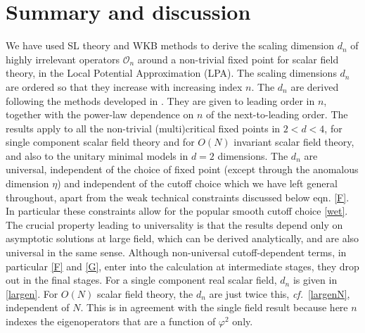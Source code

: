 \documentclass[11pt,a4paper]{article}
\numberwithin{figure}{section}
\numberwithin{equation}{section}
\newcommand{\be}{\begin{equation}}
\newcommand{\ee}{\end{equation}}
\newcommand\cf{\textit{cf.}\ }
\newcommand{\ph}{\varphi}
\newcommand{\cO}{\mathcal{O}}
\begin{document}
%
%
%
%

 




\section{Summary and discussion}
\label{sec:summary}

We have used SL theory and WKB  methods to derive the scaling dimension $d_n$ of highly irrelevant operators $\cO_n$ around a non-trivial fixed point for scalar field theory, in the Local Potential Approximation (LPA).
The scaling dimensions $d_n$ are ordered so that they increase with increasing index $n$. The $d_n$ are derived following the methods developed in \cite{Mitchell:2021qjr}. They are given to leading order in $n$, together with the power-law dependence on $n$ of the next-to-leading order. The results apply to all the non-trivial (multi)critical fixed points in $2<d<4$, for single component scalar field theory and for $O(N)$ invariant scalar field theory, and also to the unitary minimal models in $d=2$ dimensions.
The $d_n$ are universal, independent of the choice of fixed point (except through the anomalous dimension $\eta$) and independent of the cutoff choice which we have left general throughout, apart from the weak technical constraints discussed below eqn. \eqref{F}. In particular these constraints allow for the popular smooth cutoff choice \eqref{wet}. The crucial property leading to universality is that the results depend only on asymptotic solutions at large field, which can be derived analytically, and are also universal in the same sense. Although non-universal cutoff-dependent terms, in particular \eqref{F} and \eqref{G}, enter into the calculation at intermediate stages, they drop out in the final stages. For a single component real scalar field, $d_n$ is given in \eqref{largen}. 
For  $O(N)$ scalar field theory, the $d_n$ are just twice this, \cf \eqref{largenN}, independent of $N$. This is in agreement with the single field result because here $n$ indexes the eigenoperators that are a function of $\ph^2$ only.
\end{document}
